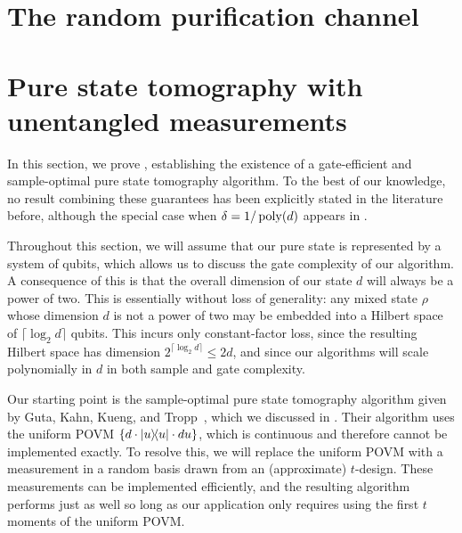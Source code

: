 \documentclass{article}
\begin{document}
\section{The random purification channel} \label{sec:the-channel}



\section{Pure state tomography with unentangled measurements}
\label{sec:unentangled}

In this section, we prove , establishing the existence of a gate-efficient and sample-optimal pure state tomography algorithm.
To the best of our knowledge, no result combining these guarantees has been explicitly stated in the literature before, although the special case when $\delta = 1/\operatorname{poly}(d)$ appears in \cite[Appendix C]{HKOT23}.

Throughout this section, we will assume that our pure state is represented by a system of qubits, which allows us to discuss the gate complexity of our algorithm.
A consequence of this is that the overall dimension of our state $d$ will always be a power of two.
This is essentially without loss of generality: any mixed state $\rho$ whose dimension $d$ is not a power of two may be embedded into a Hilbert space of $\lceil \log_2 d \rceil$ qubits. This incurs only constant-factor loss, since the resulting Hilbert space has dimension $2^{\lceil \log_2 d \rceil} \leq 2d$, and since our algorithms will scale polynomially in $d$ in both sample and gate complexity.  

Our starting point is the sample-optimal pure state tomography algorithm given by Guta, Kahn, Kueng, and Tropp~\cite{GKKT20}, which we discussed in . 
Their algorithm uses the uniform POVM $\{d \cdot \ketbra{u} \cdot du\}$, which is continuous and therefore cannot be implemented exactly.
To resolve this, we will replace the uniform POVM with a measurement in a random basis drawn from an (approximate) $t$-design.
These measurements can be implemented efficiently, and the resulting algorithm performs just as well so long as our application only requires using the first $t$ moments of the uniform POVM.
\end{document}
